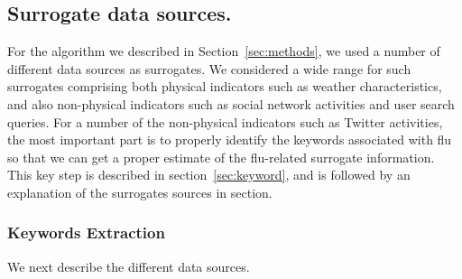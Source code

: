 

\subsection{Surrogate data sources.}
For the algorithm we described in Section~\ref{sec:methods},
we used a number of different data sources as
surrogates. We considered a wide range for such surrogates comprising both
physical indicators such as weather characteristics, and also non-physical
indicators such as social network activities and user search queries.  For a
number of the non-physical indicators such as Twitter activities, the most
important part is to properly identify the keywords associated with flu so that
we can get a proper estimate of the flu-related surrogate information. This key
step is described in section~\ref{sec:keyword}, and is followed by an
explanation of the surrogates sources in section. 

\subsubsection{\label{sec:keyword} Keywords Extraction} 

We next describe the different data sources.

